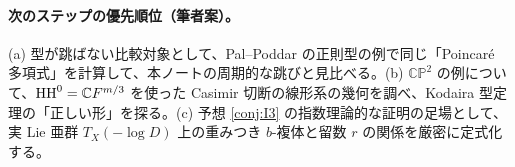 \paragraph{次のステップの優先順位（筆者案）。}
(a) 型が跳ばない比較対象として、Pal--Poddar の正則型の例で同じ「Poincaré 多項式」を計算して、本ノートの周期的な跳びと見比べる。(b) $\mathbb{CP}^2$ の例について、$\mathrm{HH}^0=\mathbb C F^{m/3}$ を使った Casimir 切断の線形系の幾何を調べ、Kodaira 型定理の「正しい形」を探る。(c) 予想 \ref{conj:I3} の指数理論的な証明の足場として、実 Lie 亜群 $T_X(-\log D)$ 上の重みつき $b$-複体と留数 $r$ の関係を厳密に定式化する。
